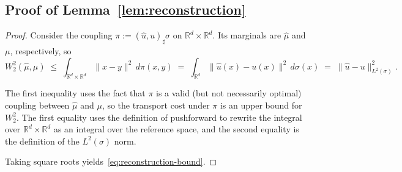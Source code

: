 \documentclass[11pt]{article}
\newcommand{\R}{\mathbb{R}}
\newcommand{\1}{\mathbf{1}}
\begin{document}
\subsection{Proof of Lemma~\ref{lem:reconstruction}}
\label{app:proof-reconstruction}
\begin{proof}
Consider the coupling $\pi := (\widehat{u},u)_\sharp \sigma$ on $\R^d\times\R^d$.
Its marginals are $\widehat{\mu}$ and $\mu$, respectively, so
\[
W_2^2(\widehat{\mu},\mu)
\;\le\; \int_{\R^d\times\R^d} \|x-y\|^2 \, d\pi(x,y)
\;=\; \int_{\R^d} \|\widehat{u}(x)-u(x)\|^2 \, d\sigma(x)
\;=\; \|\widehat{u}-u\|_{L^2(\sigma)}^2.
\]

The first inequality uses the fact that $\pi$ is a valid (but not necessarily optimal) coupling between $\widehat{\mu}$ and $\mu$, so the transport cost under $\pi$ is an upper bound for $W_2^2$.  The first equality uses the definition of pushforward to rewrite the integral over $\R^d \times \R^d$ as an integral over the reference space, and the second equality is the definition of the $L^2(\sigma)$ norm.

Taking square roots yields~\eqref{eq:reconstruction-bound}.
\end{proof}
\end{document}
